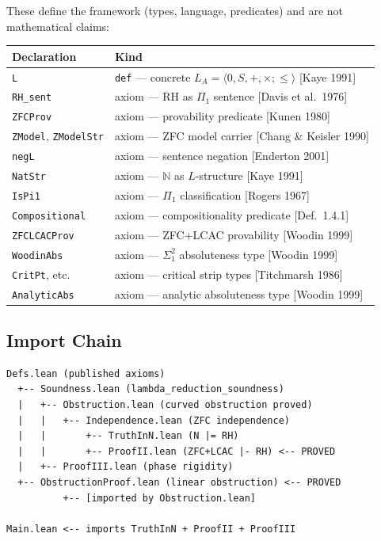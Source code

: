 These define the framework (types, language, predicates) and are not
mathematical claims:

\begin{center}
\begin{tabular}{lp{8cm}}
\toprule
\textbf{Declaration} & \textbf{Kind} \\
\midrule
\texttt{L} & \texttt{def} --- concrete $L_A = \langle 0, S, +, \times; \leq \rangle$ [Kaye 1991] \\
\texttt{RH\_sent} & axiom --- RH as $\Pi_1$ sentence [Davis et al.~1976] \\
\texttt{ZFCProv} & axiom --- provability predicate [Kunen 1980] \\
\texttt{ZModel}, \texttt{ZModelStr} & axiom --- ZFC model carrier [Chang \& Keisler 1990] \\
\texttt{negL} & axiom --- sentence negation [Enderton 2001] \\
\texttt{NatStr} & axiom --- $\mathbb{N}$ as $L$-structure [Kaye 1991] \\
\texttt{IsPi1} & axiom --- $\Pi_1$ classification [Rogers 1967] \\
\texttt{Compositional} & axiom --- compositionality predicate [Def.~1.4.1] \\
\texttt{ZFCLCACProv} & axiom --- ZFC+LCAC provability [Woodin 1999] \\
\texttt{WoodinAbs} & axiom --- $\Sigma_1^2$ absoluteness type [Woodin 1999] \\
\texttt{CritPt}, etc. & axiom --- critical strip types [Titchmarsh 1986] \\
\texttt{AnalyticAbs} & axiom --- analytic absoluteness type [Woodin 1999] \\
\bottomrule
\end{tabular}
\end{center}

\subsection*{Import Chain}

\begin{verbatim}
Defs.lean (published axioms)
  +-- Soundness.lean (lambda_reduction_soundness)
  |   +-- Obstruction.lean (curved obstruction proved)
  |   |   +-- Independence.lean (ZFC independence)
  |   |       +-- TruthInN.lean (N |= RH)
  |   |       +-- ProofII.lean (ZFC+LCAC |- RH) <-- PROVED
  |   +-- ProofIII.lean (phase rigidity)
  +-- ObstructionProof.lean (linear obstruction) <-- PROVED
          +-- [imported by Obstruction.lean]

Main.lean <-- imports TruthInN + ProofII + ProofIII
\end{verbatim}

